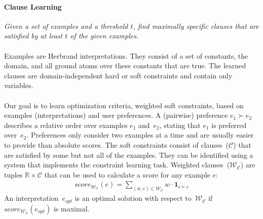 \documentclass[letterpaper]{article}
\newcommand{\sym}[1]{\ensuremath{\mathcal{#1}}}
\theoremstyle{definition}
\begin{document}
\paragraph*{Clause Learning}
\emph{Given a set of examples and a threshold $t$, find maximally specific clauses that are satisfied by at least $t$ of the given examples.}
\\\\
Examples are Herbrand interpretations.
They consist of a set of constants, the domain, and all ground atoms over these constants that are true.
The learned clauses are domain-independent hard or soft constraints and contain only variables.
\\\\
Our goal is to learn optimization criteria, weighted soft constraints, based on examples (interpretations) and user preferences.
A (pairwise) preference $e_1 \succ e_2$ describes a relative order over examples $e_1$ and~$e_2$, stating that $e_1$ is preferred over~$e_2$.
Preferences only consider two examples at a time and are usually easier to provide than absolute scores.
The soft constraints consist of clauses~(\sym{C}) that are satisfied by some but not all of the examples.
They can be identified using a system that implements the constraint learning task.
Weighted clauses~($\sym{W}_{\sym{C}}$) are tuples $\mathbb{R} \times \sym{C}$ that can be used to calculate a score for any example $e$:
\begin{eqnarray}
  \label{eqn:score}
  score_{\sym{W}_{\sym{C}}}(e) = \sum\limits_{(\mathit{w}, \mathit{c}) \in \sym{W}_{\sym{C}}} \mathit{w} \cdot \mathbf{1}_{e \models c}
\end{eqnarray}
An interpretation~$e_{opt}$ is an optimal solution with respect to~$\sym{W}_{\sym{C}}$ if $score_{\sym{W}_{\sym{C}}}(e_{opt})$ is maximal.
\end{document}
